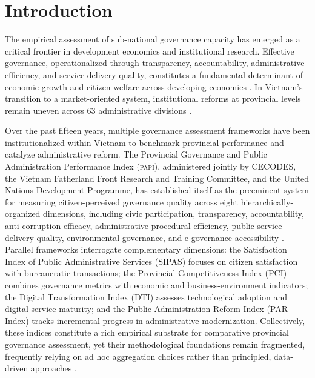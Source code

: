 \documentclass[12pt,a4paper]{article}
\newcommand{\PAPI}{\textsc{papi}\xspace}
\begin{document}
\clearpage
\tableofcontents
\clearpage

\section{Introduction}
\label{sec:introduction}


The empirical assessment of sub-national governance capacity has emerged as a critical frontier in development economics and institutional research. Effective governance, operationalized through transparency, accountability, administrative efficiency, and service delivery quality, constitutes a fundamental determinant of economic growth and citizen welfare across developing economies \citep{Acemoglu2012, Kaufmann2011}. In Vietnam's transition to a market-oriented system, institutional reforms at provincial levels remain uneven across 63 administrative divisions \citep{PAPI2024}.

Over the past fifteen years, multiple governance assessment frameworks have been institutionalized within Vietnam to benchmark provincial performance and catalyze administrative reform. The Provincial Governance and Public Administration Performance Index (\PAPI), administered jointly by CECODES, the Vietnam Fatherland Front Research and Training Committee, and the United Nations Development Programme, has established itself as the preeminent system for measuring citizen-perceived governance quality across eight hierarchically-organized dimensions, including civic participation, transparency, accountability, anti-corruption efficacy, administrative procedural efficiency, public service delivery quality, environmental governance, and e-governance accessibility \citep{PAPI2024}. Parallel frameworks interrogate complementary dimensions: the Satisfaction Index of Public Administrative Services (SIPAS) focuses on citizen satisfaction with bureaucratic transactions; the Provincial Competitiveness Index (PCI) combines governance metrics with economic and business-environment indicators; the Digital Transformation Index (DTI) assesses technological adoption and digital service maturity; and the Public Administration Reform Index (PAR Index) tracks incremental progress in administrative modernization. Collectively, these indices constitute a rich empirical substrate for comparative provincial governance assessment, yet their methodological foundations remain fragmented, frequently relying on ad hoc aggregation choices rather than principled, data-driven approaches \citep{Greco2016}.
\end{document}
